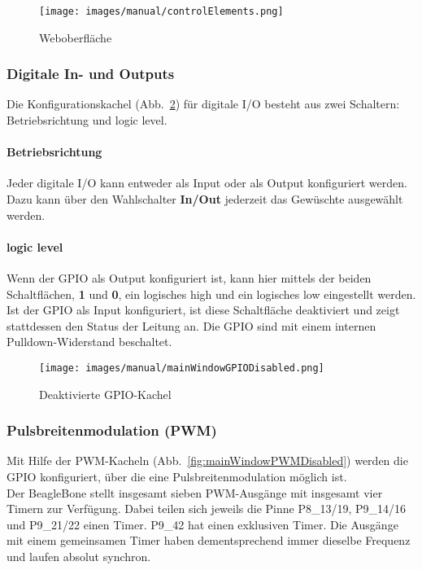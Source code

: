\documentclass[manual.tex]{subfiles}
\begin{document}
\begin{figure}[ht] 
	\centering
	\texttt{[image: images/manual/controlElements.png]}
	\caption{Weboberfläche}
	\label{fig:webinterface}
\end{figure}

\subsubsection{Digitale In- und Outputs}
Die Konfigurationskachel \mbox{(Abb. \ref{fig:mainWindowGPIODisabled})} für digitale I/O besteht aus zwei Schaltern: Betriebsrichtung und logic level.

\paragraph{Betriebsrichtung} Jeder digitale I/O kann entweder als Input oder als Output konfiguriert werden. Dazu kann über den Wahlschalter \textbf{In/Out} jederzeit das Gewüschte ausgewählt werden.

\paragraph{logic level} Wenn der GPIO als Output konfiguriert ist, kann hier mittels der beiden Schaltflächen, \textbf{1} und \textbf{0}, ein logisches high und ein logisches low eingestellt werden. Ist der GPIO als Input konfiguriert, ist diese Schaltfläche deaktiviert und zeigt stattdessen den Status der Leitung an. Die GPIO sind mit einem internen Pulldown-Widerstand beschaltet.

\begin{figure}[ht] 
	\centering
	\texttt{[image: images/manual/mainWindowGPIODisabled.png]}
	\caption{Deaktivierte GPIO-Kachel}
	\label{fig:mainWindowGPIODisabled}
\end{figure}


\subsubsection{Pulsbreitenmodulation (PWM)}
Mit Hilfe der PWM-Kacheln \mbox{(Abb. \ref{fig:mainWindowPWMDisabled})} werden die GPIO konfiguriert, über die eine Pulsbreitenmodulation möglich ist.\\

Der BeagleBone stellt insgesamt sieben PWM-Ausgänge mit insgesamt vier Timern zur Verfügung. Dabei teilen sich jeweils die Pinne P8\_13/19, P9\_14/16 und P9\_21/22 einen Timer. P9\_42 hat einen exklusiven Timer. Die Ausgänge mit einem gemeinsamen Timer haben dementsprechend immer dieselbe Frequenz und laufen absolut synchron.\\
\end{document}
